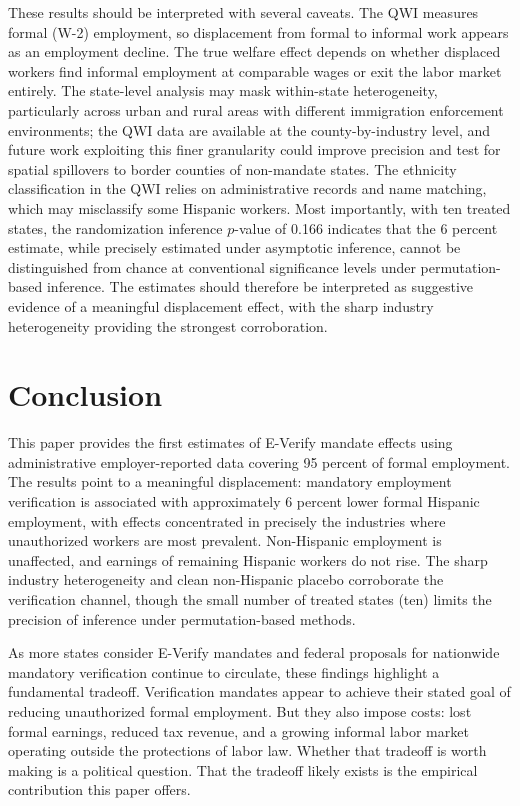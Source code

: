 \documentclass[12pt]{article}
\begin{document}
These results should be interpreted with several caveats. The QWI measures formal (W-2) employment, so displacement from formal to informal work appears as an employment decline. The true welfare effect depends on whether displaced workers find informal employment at comparable wages or exit the labor market entirely. The state-level analysis may mask within-state heterogeneity, particularly across urban and rural areas with different immigration enforcement environments; the QWI data are available at the county-by-industry level, and future work exploiting this finer granularity could improve precision and test for spatial spillovers to border counties of non-mandate states. The ethnicity classification in the QWI relies on administrative records and name matching, which may misclassify some Hispanic workers. Most importantly, with ten treated states, the randomization inference $p$-value of 0.166 indicates that the 6 percent estimate, while precisely estimated under asymptotic inference, cannot be distinguished from chance at conventional significance levels under permutation-based inference. The estimates should therefore be interpreted as suggestive evidence of a meaningful displacement effect, with the sharp industry heterogeneity providing the strongest corroboration.


\section{Conclusion}

This paper provides the first estimates of E-Verify mandate effects using administrative employer-reported data covering 95 percent of formal employment. The results point to a meaningful displacement: mandatory employment verification is associated with approximately 6 percent lower formal Hispanic employment, with effects concentrated in precisely the industries where unauthorized workers are most prevalent. Non-Hispanic employment is unaffected, and earnings of remaining Hispanic workers do not rise. The sharp industry heterogeneity and clean non-Hispanic placebo corroborate the verification channel, though the small number of treated states (ten) limits the precision of inference under permutation-based methods.

As more states consider E-Verify mandates and federal proposals for nationwide mandatory verification continue to circulate, these findings highlight a fundamental tradeoff. Verification mandates appear to achieve their stated goal of reducing unauthorized formal employment. But they also impose costs: lost formal earnings, reduced tax revenue, and a growing informal labor market operating outside the protections of labor law. Whether that tradeoff is worth making is a political question. That the tradeoff likely exists is the empirical contribution this paper offers.
\end{document}
